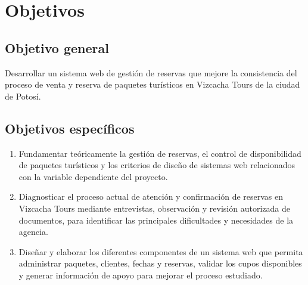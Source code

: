 \chapter{Objetivos}
\label{cap:objetivos}

\section{Objetivo general}

Desarrollar un sistema web de gestión de reservas que mejore la consistencia
del proceso de venta y reserva de paquetes turísticos en Vizcacha Tours de la
ciudad de Potosí.

\section{Objetivos específicos}

\begin{enumerate}
  \item Fundamentar teóricamente la gestión de reservas, el control de
        disponibilidad de paquetes turísticos y los criterios de diseño de
        sistemas web relacionados con la variable dependiente del proyecto.
  \item Diagnosticar el proceso actual de atención y confirmación de reservas
        en Vizcacha Tours mediante entrevistas, observación y revisión
        autorizada de documentos, para identificar las principales
        dificultades y necesidades de la agencia.
  \item Diseñar y elaborar los diferentes componentes de un sistema web que
        permita administrar paquetes, clientes, fechas y reservas, validar los
        cupos disponibles y generar información de apoyo para mejorar el
        proceso estudiado.
\end{enumerate}
